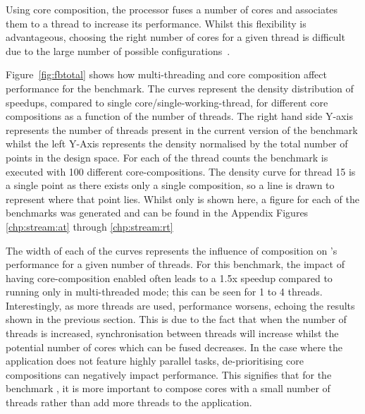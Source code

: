 Using core composition, the processor fuses a number of cores and associates them to a thread to increase its performance.
Whilst this flexibility is advantageous, choosing the right number of cores for a given thread is difficult due to the large number of possible configurations~\cite{gulati2008multitaskingdmc}.

Figure~\ref{fig:fbtotal} shows how multi-threading and core composition affect performance for the  benchmark.
The curves represent the density distribution of speedups, compared to single core/single-working-thread, for different core compositions as a function of the number of threads.
The right hand side Y-axis represents the number of threads present in the current version of the benchmark whilst the left Y-Axis represents the density normalised by the total number of points in the design space.
For each of the thread counts the benchmark is executed with 100 different core-compositions.
The density curve for thread 15 is a single point as there exists only a single composition, so a line is drawn to represent where that point lies.
Whilst only  is shown here, a figure for each of the benchmarks was generated and can be found in the Appendix Figures \ref{chp:stream:at} through \ref{chp:stream:rt}

The width of each of the curves represents the influence of composition on 's performance for a given number of threads.
For this benchmark, the impact of having core-composition enabled often leads to a 1.5x speedup compared to running only in multi-threaded mode; this can be seen for 1 to 4 threads.
Interestingly, as more threads are used, performance worsens, echoing the results shown in the previous section.
This is due to the fact that when the number of threads is increased, synchronisation between threads will increase whilst the potential number of cores which can be fused decreases.
In the case where the application does not feature highly parallel tasks, de-prioritising core compositions can negatively impact performance.
This signifies that for the benchmark , it is more important to compose cores with a small number of threads rather than add more threads to the application.



